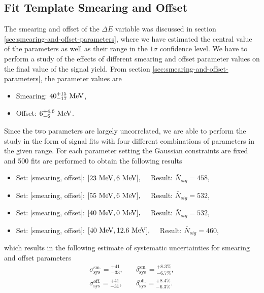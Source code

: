 \subsection{Fit Template Smearing and Offset}
The smearing and offset of the $\Delta E$ variable was discussed in section \ref{sec:smearing-and-offset-parameters}, where we have estimated the central value of the parameters as well as their range in the $1\sigma$ confidence level. We have to perform a study of the effects of different smearing and offset parameter values on the final value of the signal yield. From section \ref{sec:smearing-and-offset-parameters}, the parameter values are
\begin{itemize}
	\item Smearing: $40_{-17}^{+15}\mathrm{~MeV}$,
	\item Offset: $6_{-6}^{+4.6}\mathrm{~MeV}$.
\end{itemize}
Since the two parameters are largely uncorrelated, we are able to perform the study in the form of signal fits with four different combinations of parameters in the given range. For each parameter setting the Gaussian constraints are fixed and 500 fits are performed to obtain the following results
\begin{itemize}
	\item Set: [smearing, offset]: $[23\mathrm{~MeV},6\mathrm{~MeV}],\quad$ Result: $ \bar N {}_{sig} = 458 $,
	\item Set: [smearing, offset]: $[55\mathrm{~MeV},6\mathrm{~MeV}],\quad$ Result: $ \bar N {}_{sig} = 532 $,
	\item Set: [smearing, offset]: $[40\mathrm{~MeV},0\mathrm{~MeV}],\quad$ Result: $ \bar N {}_{sig} = 532 $,
	\item Set: [smearing, offset]: $[40\mathrm{~MeV},12.6\mathrm{~MeV}],\quad$ Result: $ \bar N {}_{sig} = 460 $,
\end{itemize}
which results in the following estimate of systematic uncertainties for smearing and offset parameters
\begin{align}
\sigma_{\mathrm{sys}}^{\mathrm{sm.}} = {}^{+41}_{-33},&\quad \delta_{\mathrm{sys}}^{\mathrm{sm.}} = {}^{+8.3\%}_{-6.7\%}, \\
\sigma_{\mathrm{sys}}^{\mathrm{off.}} = {}^{+41}_{-31},&\quad \delta_{\mathrm{sys}}^{\mathrm{off.}} = {}^{+8.4\%}_{-6.3\%}.
\end{align}


